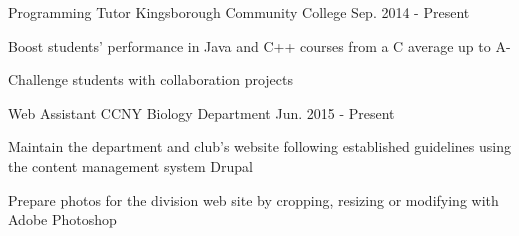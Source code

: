 \begin{cventries}

\iftrue
  \cventry
    {Programming Tutor} %
    {Kingsborough Community College} %
	{Sep. 2014 - Present} %
    {} %
    {
      \begin{cvitems} %
		\item {Boost students' performance in Java and C++ courses from a C average up to A-}
		\item {Challenge students with collaboration projects}
      \end{cvitems}
    }
\fi

\iftrue
  \cventry
    {Web Assistant} %
    {CCNY Biology Department} %
	{Jun. 2015 - Present} %
    {} %
    {
      \begin{cvitems} %
        \item {Maintain the department and club's website following
			established guidelines using the content management system Drupal}
        \item {Prepare photos for the division web site by cropping,
		  resizing or modifying with Adobe Photoshop}
      \end{cvitems}
    }
\fi


\end{cventries}
